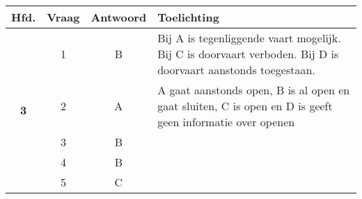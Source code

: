 
\begin{table}[h]
	\centering
	\begin{tabular}{c|c|c|m{9.5cm}}
		\textbf{Hfd.}       & \textbf{Vraag} & \textbf{Antwoord} & \textbf{Toelichting} \\ \hline 
		\multirow{5}{*}{\sffamily\bfseries{\textcolor{ocre}{\LARGE3}} } & 1   & B         &  Bij A is tegenliggende vaart mogelijk. Bij C is doorvaart verboden. Bij D is doorvaart aanstonds toegestaan.  \\ \cline{2-4} 
		& 2 & A & A gaat aanstonds open, B is al open en gaat sluiten, C is open en D is geeft geen informatie over openen  \\ \cline{2-4}  
		& 3 & B &  \\ \cline{2-4} 
		& 4 & B &  \\ \cline{2-4} 
		& 5 & C &  \\
	\end{tabular}
\end{table}


